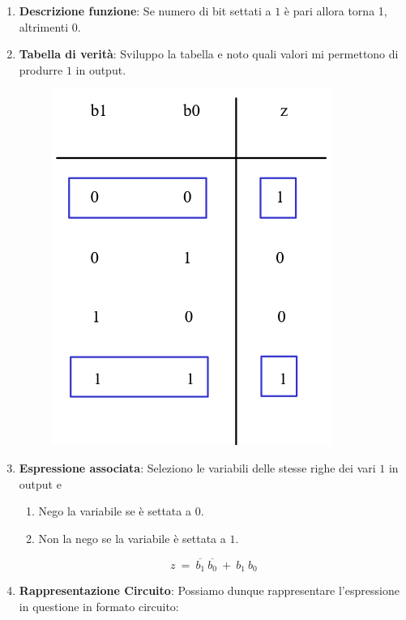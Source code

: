 \documentclass{article}
\begin{document}
\begin{enumerate}
    \item \textbf{Descrizione funzione}: Se numero di bit settati a $1$ è pari allora torna 1, altrimenti 0.
    \item \textbf{Tabella di verità}: Sviluppo la tabella e noto quali valori mi permettono di produrre $1$ in output.

    \begin{figure}[htbp]
        \center
        \includegraphics[scale=0.5]{img/tabellaVeritaBitParita.png}
    \end{figure}

    \item \textbf{Espressione associata}: Seleziono le variabili delle stesse righe dei vari $1$ in output e
    \begin{enumerate}
        \item Nego la variabile se è settata a $0$.
        \item Non la nego se la variabile è settata a $1$.
    \end{enumerate}

    \begin{equation}
        z \: = \: \overline{b_{1}} \: \overline{b_{0}} \: + \: b_{1}\:b_{0} 
    \end{equation}

    \item \textbf{Rappresentazione Circuito}: Possiamo dunque rappresentare l'espressione in questione in formato circuito:


\end{enumerate}
\end{document}
